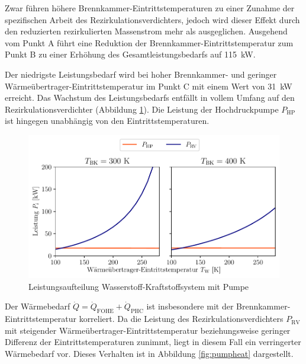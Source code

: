Zwar führen höhere Brennkammer-Eintrittstemperaturen zu einer Zunahme der spezifischen Arbeit des Rezirkulationsverdichters, jedoch wird dieser Effekt durch den reduzierten rezirkulierten Massenstrom mehr als ausgeglichen. Ausgehend vom Punkt A führt eine Reduktion der Brennkammer-Eintrittstemperatur zum Punkt B zu einer Erhöhung des Gesamtleistungsbedarfs auf \SI{115}{\kilo\W}. 

Der niedrigste Leistungsbedarf wird bei hoher Brennkammer- und geringer Wärmeübertrager-Eintrittstemperatur im Punkt C mit einem Wert von \SI{31}{\kilo\W} erreicht. Das Wachstum des Leistungsbedarfs entfällt in vollem Umfang auf den Rezirkulationsverdichter (Abbildung \ref{fig:pumpsplit}). Die Leistung der Hochdruckpumpe $P_\mathrm{HP}$ ist hingegen unabhängig von den Eintrittstemperaturen. 

\begin{figure}[ht]
\centering
\includegraphics[width=1\linewidth]{4_Abbildungen/2_Hauptteil/Ergebnisse/Pumpe_powersplit.pdf}
  \caption{Leistungsaufteilung Wasserstoff-Kraftstoffsystem mit Pumpe}
  \label{fig:pumpsplit}
\end{figure}
\FloatBarrier

Der Wärmebedarf $\dot{Q}=\dot{Q}_\mathrm{FOHE}+\dot{Q}_\mathrm{PHC}$ ist insbesondere mit der Brennkammer-Eintrittstemperatur korreliert. Da die Leistung des Rezirkulationsverdichters $P_\mathrm{RV}$ mit steigender Wärmeübertrager-Eintrittstemperatur beziehungsweise geringer Differenz der Eintrittstemperaturen zunimmt, liegt in diesem Fall ein verringerter Wärmebedarf vor. Dieses Verhalten ist in Abbildung \ref{fig:pumpheat} dargestellt.

